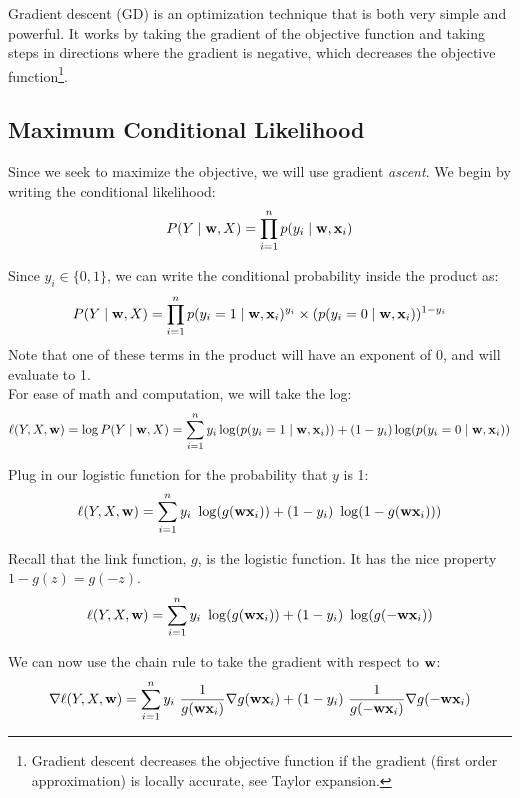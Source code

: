 \documentclass[11pt]{article}
\newcommand{\vw}{{\bf w}}
\newcommand{\vxi}{{\bf x}_i}
\newcommand{\yi}{y_i}
\begin{document}
Gradient descent (GD) is an optimization technique that is both very simple and powerful. It works by taking the gradient of the objective function and taking steps in directions where the gradient is negative, which decreases the objective function\footnote{Gradient descent decreases the objective function if the gradient (first order approximation) is locally accurate, see Taylor expansion.}. 

\subsection{Maximum Conditional Likelihood}
Since we seek to maximize the objective, we will use gradient \emph{ascent}. We begin by writing the conditional likelihood:
\begin{equation}
P(Y \mid \vw, X) = \prod_{i=1}^n{p(\yi \mid \vw, \vxi)}
\end{equation}

Since $\yi \in \{ 0,1 \}$, we can write the conditional probability inside the product as:
\begin{equation}
P(Y \mid \vw, X) = \prod_{i=1}^n{ p(\yi=1 \mid \vw, \vxi)^{\yi} \times (p(\yi=0 \mid \vw, \vxi))^{1-\yi}}
\end{equation}
Note that one of these terms in the product will have an exponent of 0, and will evaluate to 1.\\

For ease of math and computation, we will take the log:
\begin{equation}
\ell(Y,X,\vw) = \log P(Y \mid \vw, X) = \sum_{i=1}^n{ \yi \log(p(\yi=1 \mid \vw, \vxi)) + (1-\yi)\log(p(\yi=0 \mid \vw, \vxi))}
\end{equation}

Plug in our logistic function for the probability that $y$ is 1:
\begin{equation}
\ell(Y,X,\vw) = \sum_{i=1}^n{ y_i\ \log( g(\vw \vxi) ) + (1-y_i)\ \log( 1-g(\vw \vxi) ))}
\end{equation}

Recall that the link function, $g$, is the logistic function. It has the nice property $1 - g(z) = g(-z)$.
\begin{equation}
\ell(Y,X,\vw) = \sum_{i=1}^n{ y_i\ \log( g(\vw \vxi) ) + (1-y_i)\ \log( g(-\vw \vxi) )}
\end{equation}

We can now use the chain rule to take the gradient with respect to $\vw$:
\begin{equation}
\nabla \ell(Y,X,\vw) = \sum_{i=1}^n{
	y_i\ \frac{1}{g(\vw \vxi)} \nabla g(\vw \vxi)
	+ (1-y_i)\ \frac{1}{g(-\vw \vxi)} \nabla g(-\vw \vxi)
}
\end{equation}
\end{document}
